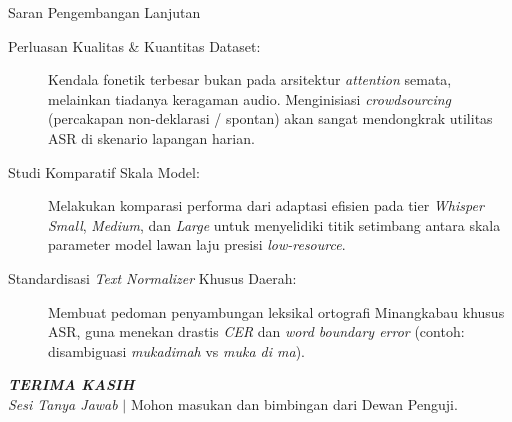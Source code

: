\begin{frame}{Saran Pengembangan Lanjutan}
    \begin{description}
        \item[Perluasan Kualitas \& Kuantitas Dataset:] Kendala fonetik terbesar bukan pada arsitektur \textit{attention} semata, melainkan tiadanya keragaman audio. Menginisiasi \textit{crowdsourcing} (percakapan non-deklarasi / spontan) akan sangat mendongkrak utilitas ASR di skenario lapangan harian.
        \item[Studi Komparatif Skala Model:] Melakukan komparasi performa dari adaptasi efisien pada tier \textit{Whisper Small}, \textit{Medium}, dan \textit{Large} untuk menyelidiki titik setimbang antara skala parameter model lawan laju presisi \textit{low-resource}.
        \item[Standardisasi \textit{Text Normalizer} Khusus Daerah:] Membuat pedoman penyambungan leksikal ortografi Minangkabau khusus ASR, guna menekan drastis \textit{CER} dan \textit{word boundary error} (contoh: disambiguasi \textit{mukadimah} vs \textit{muka di ma}).
    \end{description}
    \vspace{0.2cm}
    \begin{center}
        \Large \textbf{\textit{TERIMA KASIH}} \\
        \small \textit{Sesi Tanya Jawab} $\mid$ Mohon masukan dan bimbingan dari Dewan Penguji.
    \end{center}
\end{frame}